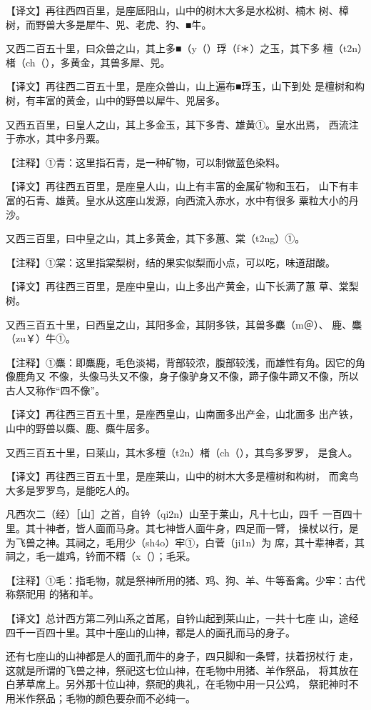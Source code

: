\documentclass[a4paper,12pt,UTF8,twoside]{ctexbook}
\begin{document}
【译文】再往西四百里，是座厎阳山，山中的树木大多是水松树、楠木 树、樟树，而野兽大多是犀牛、兕、老虎、犳、■牛。

又西二百五十里，曰众兽之山，其上多■（y（）琈（f＊）之玉，其下多 檀（t2n）楮（ch（），多黄金，其兽多犀、兕。

【译文】再往西二百五十里，是座众兽山，山上遍布■琈玉，山下到处 是檀树和构树，有丰富的黄金，山中的野兽以犀牛、兕居多。

又西五百里，曰皇人之山，其上多金玉，其下多青、雄黄①。皇水出焉， 西流注于赤水，其中多丹粟。

【注释】①青：这里指石青，是一种矿物，可以制做蓝色染料。

【译文】再往西五百里，是座皇人山，山上有丰富的金属矿物和玉石， 山下有丰富的石青、雄黄。皇水从这座山发源，向西流入赤水，水中有很多 粟粒大小的丹沙。

又西三百里，曰中皇之山，其上多黄金，其下多蕙、棠（t2ng）①。

【注释】①棠：这里指棠梨树，结的果实似梨而小点，可以吃，味道甜酸。

【译文】再往西三百里，是座中皇山，山上多出产黄金，山下长满了蕙 草、棠梨树。

又西三百五十里，曰西皇之山，其阳多金，其阴多铁，其兽多麋（m＠）、 鹿、麋（zu￥）牛①。

【注释】①麋：即麋鹿，毛色淡褐，背部较浓，腹部较浅，而雄性有角。因它的角像鹿角又 不像，头像马头又不像，身子像驴身又不像，蹄子像牛蹄又不像，所以古人又称作“四不像”。

【译文】再往西三百五十里，是座西皇山，山南面多出产金，山北面多 出产铁，山中的野兽以麋、鹿、麋牛居多。

又西三百五十里，曰莱山，其木多檀（t2n）楮（ch（），其鸟多罗罗， 是食人。

【译文】再往西三百五十里，是座莱山，山中的树木大多是檀树和构树， 而禽鸟大多是罗罗鸟，是能吃人的。

凡西次二（经）［山］之首，自钤（qi2n）山至于莱山，凡十七山，四千 一百四十里。其十神者，皆人面而马身。其七神皆人面牛身，四足而一臂， 操杖以行，是为飞兽之神。其祠之，毛用少（sh4o）牢①，白菅（ji1n）为 席，其十辈神者，其祠之，毛一雄鸡，钤而不糈（x（）；毛采。

【注释】①毛：指毛物，就是祭神所用的猪、鸡、狗、羊、牛等畜禽。少牢：古代称祭祀用 的猪和羊。

【译文】总计西方第二列山系之首尾，自钤山起到莱山止，一共十七座 山，途经四千一百四十里。其中十座山的山神，都是人的面孔而马的身子。

还有七座山的山神都是人的面孔而牛的身子，四只脚和一条臂，扶着拐杖行 走，这就是所谓的飞兽之神，祭祀这七位山神，在毛物中用猪、羊作祭品， 将其放在白茅草席上。另外那十位山神，祭祀的典礼，在毛物中用一只公鸡， 祭祀神时不用米作祭品；毛物的颜色要杂而不必纯一。
\end{document}
